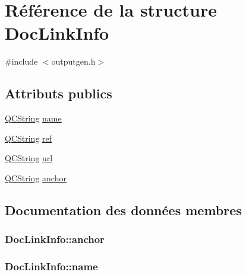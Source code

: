 \hypertarget{struct_doc_link_info}{}\section{Référence de la structure Doc\+Link\+Info}
\label{struct_doc_link_info}


{\ttfamily \#include $<$outputgen.\+h$>$}

\subsection*{Attributs publics}
\begin{DoxyCompactItemize}
\item 
\hyperlink{class_q_c_string}{Q\+C\+String} \hyperlink{struct_doc_link_info_a92c73ddcfa2201e6b0029f4b4e64458b}{name}
\item 
\hyperlink{class_q_c_string}{Q\+C\+String} \hyperlink{struct_doc_link_info_abe4bbcd9b1709f58b0b29a9020c42e42}{ref}
\item 
\hyperlink{class_q_c_string}{Q\+C\+String} \hyperlink{struct_doc_link_info_a7607f6298e3e16dd3ef26d2f823bbb9c}{url}
\item 
\hyperlink{class_q_c_string}{Q\+C\+String} \hyperlink{struct_doc_link_info_a2827af934ddee422d0f8711c9889f5e8}{anchor}
\end{DoxyCompactItemize}


\subsection{Documentation des données membres}
\hypertarget{struct_doc_link_info_a2827af934ddee422d0f8711c9889f5e8}{}
\subsubsection[{anchor}]{ Doc\+Link\+Info\+::anchor}\label{struct_doc_link_info_a2827af934ddee422d0f8711c9889f5e8}
\hypertarget{struct_doc_link_info_a92c73ddcfa2201e6b0029f4b4e64458b}{}
\subsubsection[{name}]{ Doc\+Link\+Info\+::name}\label{struct_doc_link_info_a92c73ddcfa2201e6b0029f4b4e64458b}
\hypertarget{struct_doc_link_info_abe4bbcd9b1709f58b0b29a9020c42e42}{}
